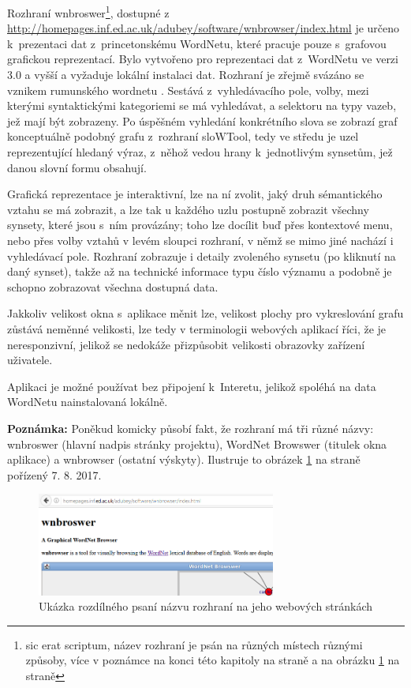 \documentclass[a4paper, 11pt, oneside, showtrims]{book}
\begin{document}
					Rozhraní wnbroswer\footnote{sic erat scriptum, název rozhraní je psán na různých místech různými způsoby, více v poznámce na konci této kapitoly na straně \pageref{note:wnbroswer} a na obrázku \ref{fig:wnbroswerbadwriting} na straně \pageref{fig:wnbroswerbadwriting}}, dostupné z \url{http://homepages.inf.ed.ac.uk/adubey/software/wnbrowser/index.html} je určeno k~prezentaci dat z~princetonskému WordNetu, které pracuje pouze s~grafovou grafickou reprezentací. Bylo vytvořeno pro reprezentaci dat z~WordNetu ve verzi 3.0 a vyšší a vyžaduje lokální instalaci dat. Rozhraní je zřejmě svázáno se vznikem rumunského wordnetu \parencite{fivser2011visualizing}. Sestává z~vyhledávacího pole, volby, mezi kterými syntaktickými kategoriemi se má vyhledávat, a selektoru na typy vazeb, jež mají být zobrazeny. Po úspěšném vyhledání konkrétního slova se zobrazí graf konceptuálně podobný grafu z~rozhraní sloWTool, tedy ve středu je uzel reprezentující hledaný výraz, z~něhož vedou hrany k~jednotlivým synsetům, jež danou slovní formu obsahují. 

					Grafická reprezentace je interaktivní, lze na ní zvolit, jaký druh sémantického vztahu se má zobrazit, a lze tak u každého uzlu postupně zobrazit všechny synsety, které jsou s~ním provázány; toho lze docílit buď přes kontextové menu, nebo přes volby vztahů v levém sloupci rozhraní, v němž se mimo jiné nachází i vyhledávací pole. Rozhraní zobrazuje i detaily zvoleného synsetu (po kliknutí na daný synset), takže až na technické informace typu číslo významu a podobně je schopno zobrazovat všechna dostupná data.

					Jakkoliv velikost okna s~aplikace měnit lze, velikost plochy pro vykreslování grafu zůstává neměnné velikosti, lze tedy v terminologii webových aplikací říci, že je neresponzivní, jelikož se nedokáže přizpůsobit velikosti obrazovky zařízení uživatele.

					Aplikaci je možné používat bez připojení k~Interetu, jelikož spoléhá na data WordNetu nainstalovaná lokálně. 

					\textbf{Poznámka:}\label{note:wnbroswer} Poněkud komicky působí fakt, že rozhraní má tři různé názvy: wnbroswer (hlavní nadpis stránky projektu), WordNet Browswer (titulek okna aplikace) a wnbrowser (ostatní výskyty). Ilustruje to obrázek \ref{fig:wnbroswerbadwriting} na straně \pageref{fig:wnbroswerbadwriting} pořízený 7. 8. 2017.

					\begin{figure}[h]
						\centering
						\includegraphics[width=0.7\textwidth]{wnbroswer.png}
						\caption{Ukázka rozdílného psaní názvu rozhraní na jeho webových stránkách}
						\label{fig:wnbroswerbadwriting}
					\end{figure}
\end{document}
